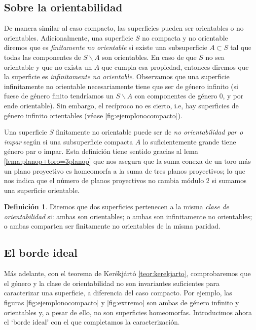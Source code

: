 \documentclass[a4paper,11pt,spanish, twoside, leqno]{tfg-uam}
\theoremstyle{definition}
\newtheorem{defin}[teor]{Definici\'on}
\begin{document}
\subsection*{Sobre la orientabilidad}
De manera similar al caso compacto, las superficies pueden ser orientables o no orientables. Adicionalmente, una superficie $S$  no compacta y no orientable diremos que es \textit{finitamente no orientable} si existe una subsuperficie $A\subset S$ tal que todas las componentes de $S\backslash A$ son orientables. En caso de que $S$ no sea orientable y que no exista un $A$ que cumpla esa propiedad, entonces diremos que la superficie es \textit{infinitamente no orientable}. Observamos que una superficie infinitamente no orientable necesariamente tiene que ser de género infinito (si fuese de género finito tendríamos un $S\backslash A$ con componentes de género 0, y por ende orientable). Sin embargo, el recíproco no es cierto, i.e, hay superficies de género infinito orientables (véase \ref{fig:ejemplonocompacto}).

Una superficie $S$ finitamente no orientable puede ser de \textit{no orientabilidad par o impar} según si una subsuperficie compacta $A$ lo suficientemente grande tiene género par o impar. Esta definición tiene sentido gracias al lema \ref{lema:planop+toro=3planop} que nos asegura que la suma conexa de un toro más un plano proyectivo es homeomorfa a la suma de tres planos proyectivos; lo que nos indica que el número de planos proyectivos no cambia módulo 2 si sumamos una superficie orientable. 
\begin{defin}
Diremos que dos superficies pertenecen a la misma \textit{clase de orientabilidad} si: ambas son orientables; o ambas son infinitamente no orientables; o ambas comparten ser finitamente no orientables de la misma paridad.
\end{defin}


\subsection{El borde ideal}

Más adelante, con el teorema de Kerékjártó \ref{teor:kerekjarto}, comprobaremos que el género y la clase de orientabilidad no son invariantes suficientes para caracterizar una superficie, a diferencia del caso compacto. Por ejemplo, las figuras \ref{fig:ejemplonocompacto} y \ref{fig:extremo} son ambas de género infinito y orientables y, a pesar de ello, no son superficies homeomorfas. Introducimos ahora el `borde ideal' con el que completamos la caracterización.
\end{document}
